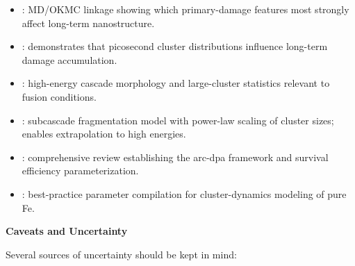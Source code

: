 \documentclass[pdflatex,sn-basic]{sn-jnl} %
\begin{document}
\begin{itemize}
\item \cite{Souidi2011CorrelationPrimaryDamage}: MD/OKMC linkage
  showing which primary-damage features most strongly affect
  long-term nanostructure.

\item \cite{Bjorkas2012PicosecondDistribution}: demonstrates that
  picosecond cluster distributions influence long-term damage
  accumulation.

\item \cite{Zarkadoula2013NatureHighEnergyFe}: high-energy cascade
  morphology and large-cluster statistics relevant to fusion
  conditions.

\item \cite{DeBacker2018FragmentedCascades}: subcascade
  fragmentation model with power-law scaling of cluster sizes;
  enables extrapolation to high energies.

\item \cite{Nordlund2018PrimaryDamageReview}: comprehensive review
  establishing the arc-dpa framework and survival efficiency
  parameterization.

\item \cite{Malerba2021PureFeParameters}: best-practice parameter
  compilation for cluster-dynamics modeling of pure Fe.
\end{itemize}


\textbf{Caveats and Uncertainty}

Several sources of uncertainty should be kept in mind:
\end{document}
